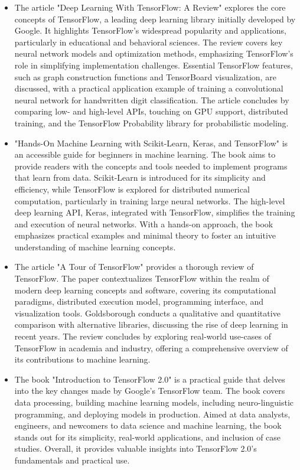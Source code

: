 \begin{itemize}
	\item The article "Deep Learning With TensorFlow: A Review" \cite{Pang:2020} explores the core concepts of TensorFlow, a leading deep learning library initially developed by Google. It highlights TensorFlow's widespread popularity and applications, particularly in educational and behavioral sciences. The review covers key neural network models and optimization methods, emphasizing TensorFlow's role in simplifying implementation challenges. Essential TensorFlow features, such as graph construction functions and TensorBoard visualization, are discussed, with a practical application example of training a convolutional neural network for handwritten digit classification. The article concludes by comparing low- and high-level APIs, touching on GPU support, distributed training, and the TensorFlow Probability library for probabilistic modeling.
	\item "Hands-On Machine Learning with Scikit-Learn, Keras, and TensorFlow" \cite{Geron:2022} is an accessible guide for beginners in machine learning. The book aims to provide readers with the concepts and tools needed to implement programs that learn from data. Scikit-Learn is introduced for its simplicity and efficiency, while TensorFlow is explored for distributed numerical computation, particularly in training large neural networks. The high-level deep learning API, Keras, integrated with TensorFlow, simplifies the training and execution of neural networks. With a hands-on approach, the book emphasizes practical examples and minimal theory to foster an intuitive understanding of machine learning concepts.
	\item The article "A Tour of TensorFlow" \cite{Goldsborough:2016} provides a thorough review of TensorFlow. The paper contextualizes TensorFlow within the realm of modern deep learning concepts and software, covering its computational paradigms, distributed execution model, programming interface, and visualization tools. Goldsborough conducts a qualitative and quantitative comparison with alternative libraries, discussing the rise of deep learning in recent years. The review concludes by exploring real-world use-cases of TensorFlow in academia and industry, offering a comprehensive overview of its contributions to machine learning.
	\item The book "Introduction to TensorFlow 2.0" \cite{Singh:2019} is a practical guide that delves into the key changes made by Google's TensorFlow team. The book covers data processing, building machine learning models, including neuro-linguistic programming, and deploying models in production. Aimed at data analysts, engineers, and newcomers to data science and machine learning, the book stands out for its simplicity, real-world applications, and inclusion of case studies. Overall, it provides valuable insights into TensorFlow 2.0's fundamentals and practical use.
\end{itemize}










